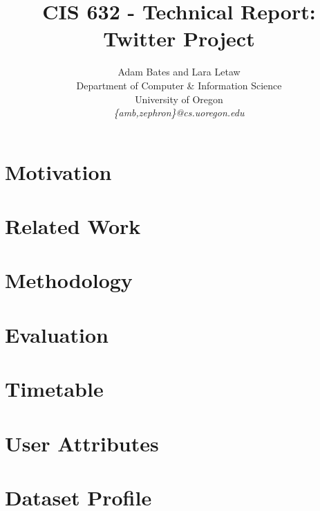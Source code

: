 \documentclass[10pt,twocolumn]{IEEEtran11}
\begin{document}


\title{\Large \bf CIS 632 - Technical Report: Twitter Project
}

\author{Adam Bates and Lara Letaw\\
Department of Computer \& Information Science\\
University of Oregon\\
\textit{\{amb,zephron\}@cs.uoregon.edu}}

\maketitle


%

\section{Motivation}  


\section{Related Work}  


\section{Methodology}


\section{Evaluation}


\section{Timetable}


\onecolumn
\section{User Attributes}


\twocolumn
\section{Dataset Profile}



\end{document}
